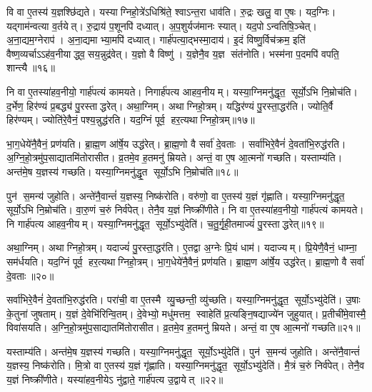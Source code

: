 वि वा ए॒तस्य॑ य॒ज्ञश्छि॑द्यते। यस्याग्निहो॒त्रे॑ऽधिश्रि॑ते॒ श्वाऽन्त॒रा धाव॑ति। रु॒द्रः खलु॒ वा ए॒षः। यद॒ग्निः। यद्गाम॑न्वत्या व॒र्तयेत्। रु॒द्राय॑ प॒शूनपि॑ दध्यात्। अ॒प॒शुर्यज॑मानः स्यात्। यद॒पोऽन्वतिषि॒ञ्चेत्। अ॒ना॒द्यम॒ग्नेराप॑। अ॒ना॒द्यमाभ्या॒मपि॑ दध्यात्। गार्\mbox{}ह॑पत्या॒द्भस्मा॒दाय॑। इ॒दं विष्णु॒र्विच॑क्रम॒ इति॑ वैष्ण॒व्यर्चाऽऽह॑व॒नीयाद्ध्व॒सय॒न्नुद्र॑वेत्। य॒ज्ञो वै विष्णु॑। य॒ज्ञेनै॒व य॒ज्ञ संत॑नोति। भस्म॑ना प॒दमपि॑ वपति॒ शान्त्यै॥१६॥\anuvakamend[वै दे॒व्यदि॑तिर्मुञ्चति सृजति करोति करोत्याभ्या॒मपि॑ दध्या॒त् पञ्च॑ च]

नि वा ए॒तस्या॑हव॒नीयो॒ गार्\mbox{}ह॑पत्यं कामयते। निगार्\mbox{}ह॑पत्य आहव॒नीयम्। यस्या॒ग्निमनु॑द्धृत॒ सूर्यो॒ऽभि नि॒म्रोच॑ति। द॒र्भेण॒ हिर॑ण्यं प्र॒बद्ध्य॑ पु॒रस्ताद्धरेत्। अथा॒ग्निम्। अथाग्निहो॒त्रम्। यद्धिर॑ण्यं पु॒रस्ता॒द्धर॑ति। ज्योति॒र्वै हिर॑ण्यम्। ज्योति॑रे॒वैनं॒ पश्य॒न्नुद्ध॑रति। यद॒ग्निं पूर्व॒ हर॒त्यथाग्निहो॒त्रम्॥१७॥

भा॒ग॒धेये॑नै॒वैनं॒ प्रण॑यति। ब्रा॒ह्म॒ण आ॑र्\mbox{}षे॒य उद्ध॑रेत्। ब्रा॒ह्म॒णो वै सर्वा॑ दे॒वताः। सर्वा॑भिरे॒वैनं॑ दे॒वता॑भि॒रुद्ध॑रति। अ॒ग्नि॒हो॒त्रमु॑प॒साद्यातमि॑तोरासीत। व्र॒तमे॒व ह॒तमनु॑ म्रियते। अन्तं॒ वा ए॒ष आ॒त्मनो॑ गच्छति। यस्ताम्य॑ति। अन्त॑मे॒ष य॒ज्ञस्य॑ गच्छति। यस्या॒ग्निमनु॑द्धृ॒त सूर्यो॒ऽभि नि॒म्रोच॑ति॥१८॥

पुन॑ स॒मन्य॑ जुहोति। अन्ते॑नै॒वान्तं॑ य॒ज्ञस्य॒ निष्क॑रोति। वरु॑णो॒ वा ए॒तस्य॑ य॒ज्ञं गृ॑ह्णाति। यस्या॒ग्निमनु॑द्धृत॒ सूर्यो॒ऽभि नि॒म्रोच॑ति। वा॒रु॒णं च॒रुं निर्व॑पेत्। तेनै॒व य॒ज्ञं निष्क्री॑णीते। नि वा ए॒तस्या॑हव॒नीयो॒ गार्\mbox{}ह॑पत्यं कामयते। नि गार्\mbox{}ह॑पत्य आहव॒नीयम्। यस्या॒ग्निमनु॑द्धृत॒ सूर्यो॒ऽभ्यु॑देति॑। च॒तु॒र्गृ॒ही॒तमाज्यं॑ पु॒रस्ताद्धरेत्॥१९॥

अथा॒ग्निम्। अथाग्निहो॒त्रम्। यदाज्यं॑ पु॒रस्ता॒द्धर॑ति। ए॒तद्वा अ॒ग्नेः प्रि॒यं धाम॑। यदाज्यम्। प्रि॒येणै॒वैनं॒ धाम्ना॒ सम॑र्धयति। यद॒ग्निं पूर्व॒ हर॒त्यथाग्निहो॒त्रम्। भा॒ग॒धेये॑नै॒वैनं॒ प्रण॑यति। ब्रा॒ह्म॒ण आ॑र्\mbox{}षे॒य उद्ध॑रेत्। ब्रा॒ह्म॒णो वै सर्वा॑ दे॒वताः॥२०॥

सर्वा॑भिरे॒वैनं॑ दे॒वता॑भि॒रुद्ध॑रति। परा॑ची॒ वा ए॒तस्मै व्यु॒च्छन्ती॒ व्यु॑च्छति। यस्या॒ग्निमनु॑द्धृत॒ सूर्यो॒ऽभ्यु॑देति॑। उ॒षाः के॒तुना॑ जुषताम्। य॒ज्ञं दे॒वेभि॑रिन्वि॒तम्। दे॒वेभ्यो॒ मधु॑मत्तम॒ स्वाहेति॑ प्र॒त्यङ्नि॒षद्याज्ये॑न जुहुयात्। प्र॒तीची॑मे॒वास्मै॒ विवा॑सयति। अ॒ग्नि॒हो॒त्रमु॑प॒साद्यातमि॑तोरासीत। व्र॒तमे॒व ह॒तमनु॑ म्रियते। अन्तं॒ वा ए॒ष आ॒त्मनो॑ गच्छति॥२१॥

यस्ताम्य॑ति। अन्त॑मे॒ष य॒ज्ञस्य॑ गच्छति। यस्या॒ग्निमनु॑द्धृत॒ सूर्यो॒ऽभ्यु॑देति॑। पुन॑ स॒मन्य॑ जुहोति। अन्ते॑नै॒वान्तं॑ य॒ज्ञस्य॒ निष्क॑रोति। मि॒त्रो वा ए॒तस्य॑ य॒ज्ञं गृ॑ह्णाति। यस्या॒ग्निमनु॑द्धृत॒ सूर्यो॒ऽभ्यु॑देति॑। मै॒त्रं च॒रुं निर्व॑पेत्। तेनै॒व य॒ज्ञं निष्क्री॑णीते। यस्या॑हव॒नीयेऽ नु॑द्वाते॒ गार्\mbox{}ह॑पत्य उ॒द्वायेत् ॥२२॥

